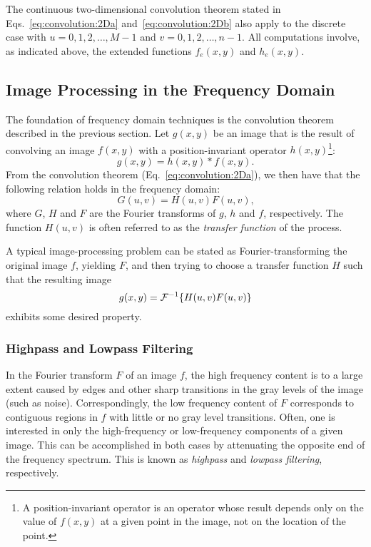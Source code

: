 The continuous two-dimensional convolution theorem stated in
Eqs.~\ref{eq:convolution:2Da} and~\ref{eq:convolution:2Db} also apply
to the discrete case with $u=0,1,2,\ldots,M-1$ and
$v=0,1,2,\ldots,n-1$.  All computations involve, as indicated above,
the extended functions $f_{e}(x,y)$ and $h_{e}(x,y)$.

\subsection{Image Processing in the Frequency Domain}
\label{image:frequency:image}

The foundation of frequency domain techniques is the convolution
theorem described in the previous section.  Let $g(x,y)$ be an image
that is the result of convolving an image $f(x,y)$ with a
position-invariant operator $h(x,y)$\footnote{A position-invariant
  operator is an operator whose result depends only on the value of
  $f(x,y)$ at a given point in the image, not on the location of the
  point.}:
\begin{equation}
\label{eq:convolution:operator}
  g(x,y)=h(x,y)\ast f(x,y)\mbox{.}
\end{equation}
From the convolution theorem (Eq.~\ref{eq:convolution:2Da}), we then
have that the following relation holds in the frequency domain:
\begin{equation}
  G(u,v)=H(u,v)F(u,v)\mbox{,}
\end{equation}
where $G$, $H$ and $F$ are the Fourier transforms of $g$, $h$ and $f$,
respectively.  The function $H(u,v)$ is often referred to as the {\em
  transfer function\/} of the process.

A typical image-processing problem can be stated as
Fourier-transforming the original image $f$, yielding $F$, and then
trying to choose a transfer function $H$ such that the resulting image
\begin{equation}
  g(x,y)={\cal F}^{-1}\{H(u,v)F(u,v)\}
\end{equation}
exhibits some desired property.

\subsubsection{Highpass and Lowpass Filtering}

In the Fourier transform $F$ of an image $f$, the high frequency
content is to a large extent caused by edges and other sharp
transitions in the gray levels of the image (such as noise).
Correspondingly, the low frequency content of $F$ corresponds to
contiguous regions in $f$ with little or no gray level transitions.
Often, one is interested in only the high-frequency or low-frequency
components of a given image.  This can be accomplished in both cases
by attenuating the opposite end of the frequency spectrum.  This is
known as {\em highpass\/} and {\em lowpass filtering\/}, respectively.

